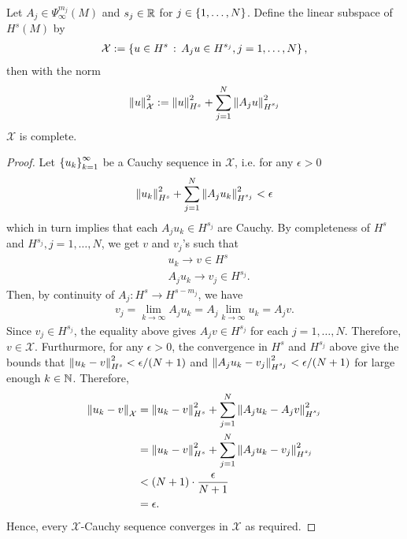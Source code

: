 \documentclass[12pt]{article}
\begin{document}
\begin{flemma}
    Let $A_j \in \Psi^{m_j}_{\infty}(M)$ and $s_j \in \R$ for $j \in \set{1, \dots, N}$. Define the linear subspace of $H^{s}(M)$ by 
    \begin{align*}
    \mathcal{X} := \set{u \in H^{s} \wh A_ju \in H^{s_j}, j = 1, \dots, N},
    \end{align*}
    then with the norm
    \begin{align*}
    \norm[u]_{\mathcal{X}}^2 := \norm[u]_{H^s}^2 + \sum_{j = 1}^N \norm[A_j u]_{H^{s_j}}^2
    \end{align*}
    $\mathcal{X}$ is complete. 
\end{flemma}
\begin{proof}
    Let $\set{u_k}_{k=1}^\infty $ be a Cauchy sequence in $\mathcal{X}$, i.e. for any $\epsilon > 0$
    \begin{align*}
    \norm[u_k]_{H^s}^2 + \sum_{j = 1}^N \norm[A_j u_k]_{H^{s_j}}^2 < \epsilon
    \end{align*}
    which in turn implies that each $A_ju_k \in H^{s_j}$ are Cauchy. By completeness of $H^s$ and $H^{s_j}, j = 1, \dots, N$, we get $v$ and $v_j$'s such that 
    \begin{align*}
    &u_k \to v \in H^s\\
    &A_j u_k \to v_j \in H^{s_j}. 
    \end{align*}
    Then, by continuity of $A_j : H^s \to H^{s - m_j}$, we have 
    \begin{align*}
    v_j = \lim_{k \to \infty} A_j u_k = A_j \lim_{k \to \infty}u_k = A_j v. 
    \end{align*}
    Since $v_j \in H^{s_j}$, the equality above gives $A_jv \in H^{s_j}$ for each $j = 1, \dots, N$. Therefore, $v \in \mathcal{X}$. Furthurmore, for any $\epsilon > 0$, the convergence in $H^s$ and $H^{s_j}$ above give the bounds that $ \norm[u_k - v]_{H^s}^2 < \epsilon / (N + 1)$ and $\norm[A_j u_k - v_j]_{H^{s_j}}^2 < \epsilon / (N +1)$ for large enough $k \in \N$. Therefore, 
    \begin{align*}
    \norm[u_k - v]_{\mathcal{X}} 
    &= \norm[u_k - v]_{H^s}^2 + \sum_{j = 1}^N \norm[A_j u_k - A_jv]_{H^{s_j}}^2\\
    &= \norm[u_k - v]_{H^s}^2 + \sum_{j = 1}^N \norm[A_j u_k - v_j]_{H^{s_j}}^2 \\
    & < (N + 1) \cdot \frac{\epsilon}{N + 1} \\
    & = \epsilon. 
    \end{align*}
    Hence, every $\mathcal{X}$-Cauchy sequence converges in $\mathcal{X}$ as required. 
    
\end{proof}
\end{document}
